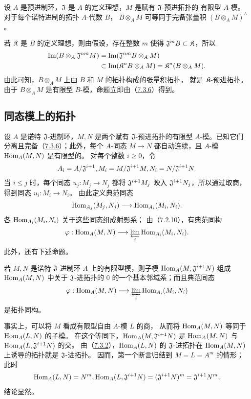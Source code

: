 设 $A$ 是预进制环，$\mathfrak J$ 是 $A$ 的定义理想，$M$ 是赋有 $\mathfrak J$-预进拓扑的
有限型 $A$-模。对于每个诺特进制的拓扑 $A$-代数 $B$，
$B\otimes_A M$ 可等同于完备张量积 $(B\otimes_A M)^\wedge$。

若 $\mathfrak K$ 是 $B$ 的定义理想，则由假设，存在整数 $m$ 使得
$\mathfrak J^mB\subset\mathfrak K$，所以
\begin{align*}
 \operatorname{Im}(B\otimes_A\mathfrak J^{nm}M)
 &=\operatorname{Im}(\mathfrak J^{nm}B\otimes_A M)\\
 &\subset\operatorname{Im}(\mathfrak K^nB\otimes_A M)
 =\mathfrak K^n(B\otimes_A M).
\end{align*}
由此可知，$B\otimes_A M$ 上由 $B$ 和 $M$ 的拓扑构成的张量积拓扑，
就是 $\mathfrak K$-预进拓扑。
由于 $B\otimes_A M$ 是有限型 $B$-模，命题立即由（\hyperlink{para:0:7.3.6}{7.3.6}）得到。



\par

\subsection{同态模上的拓扑}\hypertarget{heading:0:7.8}{}

设 $A$ 是诺特 $\mathfrak J$-进制环，$M,N$ 是两个赋有 $\mathfrak J$-预进拓扑的有限型
$A$-模。已知它们分离且完备（\hyperlink{para:0:7.3.6}{7.3.6}）；此外，每个 $A$-同态 $M\to N$
都自动连续，且 $A$-模 $\operatorname{Hom}_A(M,N)$ 是有限型的。
对每个整数 $i\geq0$，令
\[
 A_i=A/\mathfrak J^{i+1},
 M_i=M/\mathfrak J^{i+1}M,
 N_i=N/\mathfrak J^{i+1}N.
\]
当 $i\leq j$ 时，每个同态 $u_j:M_j\to N_j$ 都将 $\mathfrak J^{i+1}M_j$
映入 $\mathfrak J^{i+1}N_j$，所以通过取商，得到同态 $u_i:M_i\to N_i$。
由此定义典范同态
\[
 \operatorname{Hom}_{A_j}(M_j,N_j)\longrightarrow\operatorname{Hom}_{A_i}(M_i,N_i).
\]
各 $\operatorname{Hom}_{A_i}(M_i,N_i)$ 关于这些同态组成射影系；
由（\hyperlink{para:0:7.2.10}{7.2.10}），有典范同构
\[
 \varphi:\operatorname{Hom}_A(M,N)\longrightarrow
 \varprojlim_i\operatorname{Hom}_{A_i}(M_i,N_i).
\]
此外，还有下述命题。

若 $M,N$ 是诺特 $\mathfrak J$-进制环 $A$ 上的有限型模，则子模
$\operatorname{Hom}_A(M,\mathfrak J^{i+1}N)$ 组成 $\operatorname{Hom}_A(M,N)$ 中关于 $\mathfrak J$-进拓扑的
$0$ 的一个基本邻域系；而且典范同态
\[
 \varphi:\operatorname{Hom}_A(M,N)\longrightarrow
 \varprojlim_i\operatorname{Hom}_{A_i}(M_i,N_i)
\]
是拓扑同构。

事实上，可以将 $M$ 看成有限型自由 $A$-模 $L$ 的商，
从而将 $\operatorname{Hom}_A(M,N)$ 等同于 $\operatorname{Hom}_A(L,N)$ 的子模。
在这个等同下，$\operatorname{Hom}_A(M,\mathfrak J^{i+1}N)$ 是
$\operatorname{Hom}_A(M,N)$ 与 $\operatorname{Hom}_A(L,\mathfrak J^{i+1}N)$ 的交。
由（\hyperlink{para:0:7.3.2}{7.3.2}），$\operatorname{Hom}_A(L,N)$ 的 $\mathfrak J$-进拓扑在
$\operatorname{Hom}_A(M,N)$ 上诱导的拓扑就是 $\mathfrak J$-进拓扑。
因而，第一个断言归结到 $M=L=A^m$ 的情形；此时
\[
 \operatorname{Hom}_A(L,N)=N^m,
 \operatorname{Hom}_A(L,\mathfrak J^{i+1}N)=(\mathfrak J^{i+1}N)^m=\mathfrak J^{i+1}N^m,
\]
结论显然。

